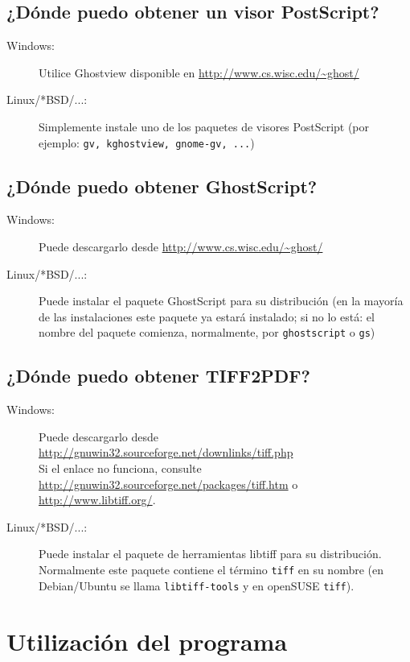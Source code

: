 \documentclass[a4paper,10pt]{scrartcl}
\begin{document}
\subsection{¿Dónde puedo obtener un visor PostScript?}
\begin{description}
\item[Windows:] Utilice Ghostview disponible en
\url{http://www.cs.wisc.edu/~ghost/}\\
\item[Linux/*BSD/...:] Simplemente instale uno de los paquetes de visores PostScript
		(por ejemplo: \texttt{gv, kghostview, gnome-gv, ...})
\end{description}


\subsection{¿Dónde puedo obtener GhostScript?}
\begin{description}
\item[Windows:] Puede descargarlo desde \url{http://www.cs.wisc.edu/~ghost/}
\item[Linux/*BSD/...:] Puede instalar el paquete GhostScript para su distribución (en la mayoría de las instalaciones este paquete ya estará instalado; si no lo está: el nombre del paquete comienza, normalmente, por \texttt{ghostscript} o \texttt{gs})
\end{description}

\subsection{¿Dónde puedo obtener TIFF2PDF?}
\begin{description}
\item[Windows:] Puede descargarlo desde \url{http://gnuwin32.sourceforge.net/downlinks/tiff.php}\\ Si el enlace no funciona, consulte \url{http://gnuwin32.sourceforge.net/packages/tiff.htm} o \url{http://www.libtiff.org/}.
\item[Linux/*BSD/...:] Puede instalar el paquete de herramientas libtiff para su distribución. Normalmente este paquete contiene el término \texttt{tiff} en su nombre (en Debian/Ubuntu se llama \texttt{libtiff-tools} y en openSUSE \texttt{tiff}).
\end{description}

\section{Utilización del programa}	
\end{document}
